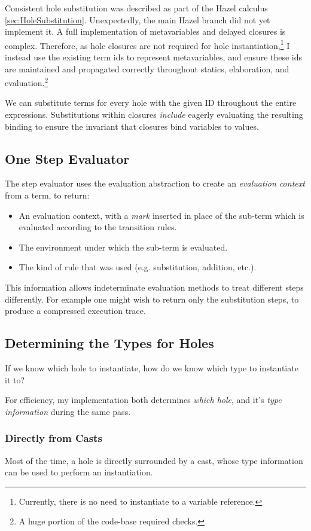 Consistent hole substitution was described as part of the Hazel calculus \cref{sec:HoleSubstitution}. Unexpectedly, the main Hazel branch did not yet implement it. A full implementation of metavariables and delayed closures is complex. Therefore, as hole closures are not required for hole instantiation,\footnote{Currently, there is no need to instantiate to a variable reference.} I instead use the existing term ids to represent metavariables, and ensure these ids are maintained and propagated correctly throughout statics, elaboration, and evaluation.\footnote{A huge portion of the code-base required checks.}

We can substitute terms for every hole with the given ID throughout the entire expressions. Substitutions within closures \textit{include} eagerly evaluating the resulting binding to ensure the invariant that closures bind variables to values. 

\subsection{One Step Evaluator}\label{sec:OneStepEvaluator}
The step evaluator uses the evaluation abstraction to create an \textit{evaluation context} from a term, to return:
\begin{itemize}
\item An evaluation context, with a \textit{mark} inserted in place of the sub-term which is evaluated according to the transition rules.
\item The environment under which the sub-term is evaluated.
\item The kind of rule that was used (e.g. substitution, addition, etc.).
\end{itemize}

This information allows indeterminate evaluation methods to treat different steps differently. For example one might wish to return only the substitution steps, to produce a compressed execution trace.

\subsection{Determining the Types for Holes}
\label{sec:TypesForHoles}
If we know which hole to instantiate, how do we know which type to instantiate it to?

For efficiency, my implementation both determines \textit{which hole}, and it's \textit{type information} during the same pass.

\subsubsection{Directly from Casts}
Most of the time, a hole is directly surrounded by a cast, whose type information can be used to perform an instantiation.


